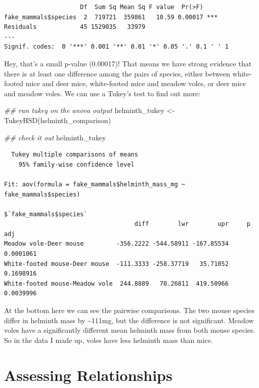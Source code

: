 \documentclass[
  letterpaper,
  DIV=11,
  numbers=noendperiod]{scrreprt}
\newenvironment{Shaded}{\begin{snugshade}}{\end{snugshade}}
\newcommand{\DocumentationTok}[1]{\textcolor[rgb]{0.37,0.37,0.37}{\textit{#1}}}
\newcommand{\FunctionTok}[1]{\textcolor[rgb]{0.28,0.35,0.67}{#1}}
\newcommand{\NormalTok}[1]{\textcolor[rgb]{0.00,0.23,0.31}{#1}}
\newcommand{\OtherTok}[1]{\textcolor[rgb]{0.00,0.23,0.31}{#1}}
\begin{document}
\begin{verbatim}
                     Df  Sum Sq Mean Sq F value  Pr(>F)    
fake_mammals$species  2  719721  359861   10.59 0.00017 ***
Residuals            45 1529035   33979                    
---
Signif. codes:  0 '***' 0.001 '**' 0.01 '*' 0.05 '.' 0.1 ' ' 1
\end{verbatim}

Hey, that's a small p-value (0.00017)! That means we have strong
evidence that there is at least one difference among the pairs of
species, either between white-footed mice and deer mice, white-footed
mice and meadow voles, or deer mice and meadow voles. We can use a
Tukey's test to find out more:

\begin{Shaded}
\begin{Highlighting}[]
\DocumentationTok{\#\# run tukey on the anova output}
\NormalTok{helminth\_tukey }\OtherTok{\textless{}{-}} \FunctionTok{TukeyHSD}\NormalTok{(helminth\_comparison)}

\DocumentationTok{\#\# check it out}
\NormalTok{helminth\_tukey}
\end{Highlighting}
\end{Shaded}

\begin{verbatim}
  Tukey multiple comparisons of means
    95% family-wise confidence level

Fit: aov(formula = fake_mammals$helminth_mass_mg ~ fake_mammals$species)

$`fake_mammals$species`
                                    diff        lwr        upr     p adj
Meadow vole-Deer mouse         -356.2222 -544.58911 -167.85534 0.0001061
White-footed mouse-Deer mouse  -111.3333 -258.37719   35.71052 0.1698916
White-footed mouse-Meadow vole  244.8889   70.26811  419.50966 0.0039996
\end{verbatim}

At the bottom here we can see the pairwise comparisons. The two mouse
species differ in helminth mass by \textasciitilde111mg, but the
difference is not significant. Meadow voles have a significantly
different mean helminth mass from both mouse species. So in the data I
made up, voles have less helminth mass than mice.

\section{Assessing Relationships}\label{assessing-relationships}
\end{document}
